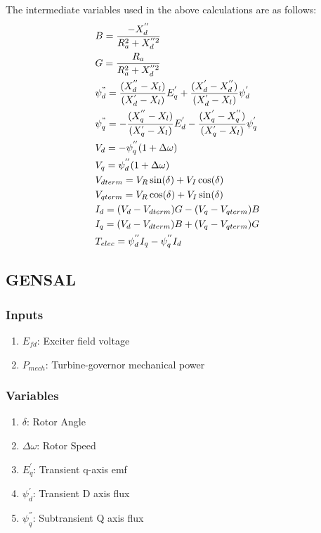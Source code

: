 \documentclass[12pt]{article}
\newcommand{\dw}{\Delta\omega}
\newcommand{\Pm}{P_{mech}}
\newcommand{\Efd}{E_{fd}}
\begin{document}
The intermediate variables used in the above calculations are as follows:
\begin{align*}
  &B = \dfrac{-X^{''}_d}{R^2_a + X^{''2}_d}&\\
 &G = \dfrac{R_a}{R^2_a+X^{''2}_d}&\\
 &\psi^{"}_{d}=\dfrac{(X^{''}_d-X_l)}{(X^{'}_d-X_l)}E^{'}_q + \dfrac{(X^{'}_d-X^{''}_d)}{(X^{'}_d-X_l)}\psi^{'}_d&\\
 &\psi^{"}_{q}=-\dfrac{(X^{''}_q-X_l)}{(X^{'}_q-X_l)}E^{'}_d - \dfrac{(X^{'}_q-X^{''}_q)}{(X^{'}_q-X_l)}\psi^{'}_q&\\
  &V_d=-\psi^{''}_{q}(1+{\Delta\omega})&\\
  &V_q=\psi^{''}_{d}(1+{\dw})&\\
  &V_{dterm} = V_R\sin({\delta})+V_I\cos({\delta})&\\
  &V_{qterm} = V_R\cos({\delta})+V_I\sin({\delta})&\\
  &I_d = (V_d-V_{dterm})G-(V_q-V_{qterm})B&\\
  &I_q = (V_d-V_{dterm})B+(V_q-V_{qterm})G& \\
   &T_{elec}=\psi^{''}_{d}I_q-\psi^{''}_{q}I_d&
  \end{align*}


\subsection{GENSAL}

\subsubsection{Inputs}

\begin{enumerate}
	\item $\Efd$: Exciter field voltage
	\item $\Pm$: Turbine-governor mechanical power
\end{enumerate}

\subsubsection{Variables}
\begin{enumerate}
  \item ${\delta}$: Rotor Angle
  \item ${\dw}$: Rotor Speed 
  \item $E^{'}_q$: Transient q-axis emf
  \item $\psi^{'}_d$: Transient D axis flux
  \item $\psi^{''}_q$: Subtransient Q axis flux 
\end{enumerate}
\end{document}
